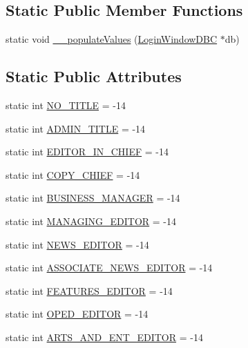 \subsection*{Static Public Member Functions}
\begin{DoxyCompactItemize}
\item 
static void \hyperlink{class_title_def_abb8d112b434153148820ca02ebe66f8b}{\+\_\+\+\_\+populate\+Values} (\hyperlink{class_login_window_d_b_c}{Login\+Window\+D\+B\+C} $\ast$db)
\end{DoxyCompactItemize}
\subsection*{Static Public Attributes}
\begin{DoxyCompactItemize}
\item 
static int \hyperlink{class_title_def_a63acddb03207bede087fcd51e62094e1}{N\+O\+\_\+\+T\+I\+T\+L\+E} = -\/14
\item 
static int \hyperlink{class_title_def_a91c680ffd707e27a39e60aa3678e55d0}{A\+D\+M\+I\+N\+\_\+\+T\+I\+T\+L\+E} = -\/14
\item 
static int \hyperlink{class_title_def_a7549cdf7b9142f3d4fdee3df970cd959}{E\+D\+I\+T\+O\+R\+\_\+\+I\+N\+\_\+\+C\+H\+I\+E\+F} = -\/14
\item 
static int \hyperlink{class_title_def_a496ab9bd38bfa9102499a7fc849791e9}{C\+O\+P\+Y\+\_\+\+C\+H\+I\+E\+F} = -\/14
\item 
static int \hyperlink{class_title_def_a989af1bb0004288e621855261e4d5efa}{B\+U\+S\+I\+N\+E\+S\+S\+\_\+\+M\+A\+N\+A\+G\+E\+R} = -\/14
\item 
static int \hyperlink{class_title_def_a4f83a19355912baa45664719d3716549}{M\+A\+N\+A\+G\+I\+N\+G\+\_\+\+E\+D\+I\+T\+O\+R} = -\/14
\item 
static int \hyperlink{class_title_def_ae4974b94e838289344af5337aaa8e2c9}{N\+E\+W\+S\+\_\+\+E\+D\+I\+T\+O\+R} = -\/14
\item 
static int \hyperlink{class_title_def_abea836c4ef13ebb0acb3ddeef986510f}{A\+S\+S\+O\+C\+I\+A\+T\+E\+\_\+\+N\+E\+W\+S\+\_\+\+E\+D\+I\+T\+O\+R} = -\/14
\item 
static int \hyperlink{class_title_def_a9caf7cfd7a14a9b51fe9eb9d3219b61c}{F\+E\+A\+T\+U\+R\+E\+S\+\_\+\+E\+D\+I\+T\+O\+R} = -\/14
\item 
static int \hyperlink{class_title_def_a0be38d9740807ff046fcb4e95e2e12c5}{O\+P\+E\+D\+\_\+\+E\+D\+I\+T\+O\+R} = -\/14
\item 
static int \hyperlink{class_title_def_a952b33d88f4ebfcfc58bfed959b82f0b}{A\+R\+T\+S\+\_\+\+A\+N\+D\+\_\+\+E\+N\+T\+\_\+\+E\+D\+I\+T\+O\+R} = -\/14

\end{DoxyCompactItemize}
